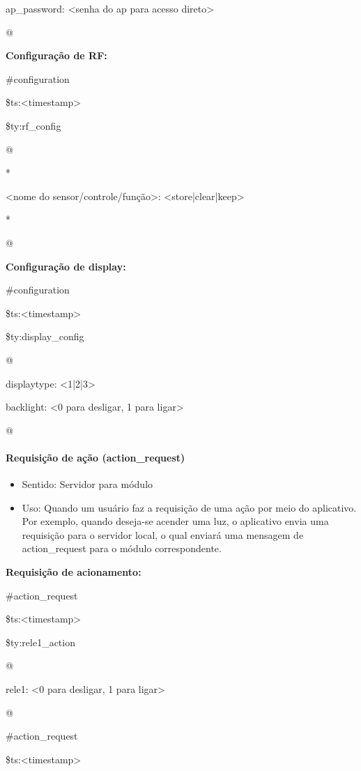 ap\_password: \textless senha do ap para acesso direto\textgreater

@

\textbf{Configuração de RF:}

\#configuration

\$ts:\textless timestamp\textgreater

\$ty:rf\_config

@

*

\textless nome do sensor/controle/função\textgreater : \textless store|clear|keep\textgreater

*

@

\textbf{Configuração de display:}

\#configuration

\$ts:\textless timestamp\textgreater

\$ty:display\_config

@

displaytype: \textless 1|2|3\textgreater

backlight: \textless 0 para desligar, 1 para ligar\textgreater

@

\paragraph{Requisição de ação (action\_request)}
\begin{itemize}
\item Sentido: Servidor para módulo
\item Uso: Quando um usuário faz a requisição de uma ação por meio do aplicativo. Por exemplo, quando deseja-se acender uma luz, o aplicativo envia uma requisição para o servidor local, o qual enviará uma mensagem de action\_request para o módulo correspondente.
\end{itemize}

\textbf{Requisição de acionamento:}

\#action\_request

\$ts:\textless timestamp\textgreater

\$ty:rele1\_action

@

rele1: \textless 0 para desligar, 1 para ligar\textgreater

@


\#action\_request

\$ts:\textless timestamp\textgreater

